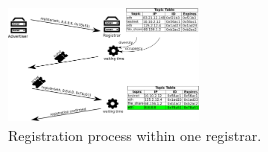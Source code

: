 


\begin{figure}
    \includegraphics[width=0.45\textwidth]{img/registration}
    \caption{Registration process within one registrar.}
    \label{fig:registration}
\end{figure}


